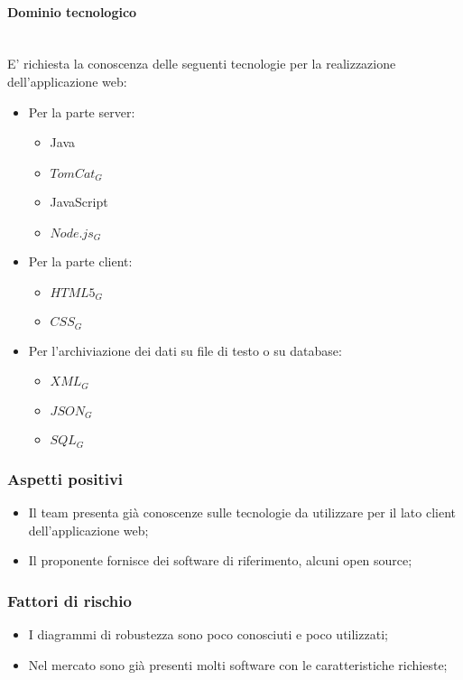 			\paragraph{Dominio tecnologico}
			\mbox{}\\
			E' richiesta la conoscenza delle seguenti tecnologie per la realizzazione dell'applicazione web:
				\begin{itemize}
					\item Per la parte server:
					\begin{itemize}
						\item Java
						\item $TomCat_G$
						\item JavaScript
						\item $Node.js_G$
					\end{itemize}
					\item Per la parte client:
					\begin{itemize}
						\item $HTML5_G$
						\item $CSS_G$
					\end{itemize}
					\item Per l'archiviazione dei dati su file di testo o su database:
					\begin{itemize}
						\item $XML_G$
						\item $JSON_G$
						\item $SQL_G$
					\end{itemize}
				\end{itemize}
		\subsubsection{Aspetti positivi}
		\begin{itemize}
			\item Il team presenta già conoscenze sulle tecnologie da utilizzare per il lato client dell'applicazione web;
			\item Il proponente fornisce dei software di riferimento, alcuni open source;
		\end{itemize}
		\subsubsection{Fattori di rischio}
		\begin{itemize}
			\item I diagrammi di robustezza sono poco conosciuti e poco utilizzati;
			\item Nel mercato sono già presenti molti software con le caratteristiche richieste;
		\end{itemize}
